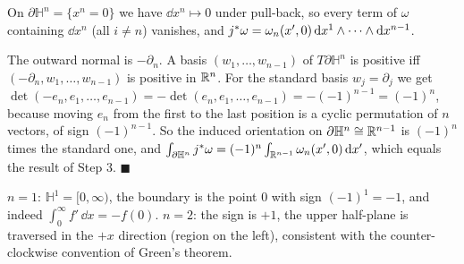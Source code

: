  On $\partial\mathbb H^n=\{x^n=0\}$ we have $\dd x^n\mapsto0$ under pull-back, so every term of $\omega$ containing $\dd x^n$ (all $i\neq n$) vanishes, and $j{}^{*}\omega=\omega_n(x',0)\,\mathrm{d} x^1\wedge\cdots\wedge\mathrm{d} x^{n-1}$.

 The outward normal is $-\partial_n$. A basis $(w_1,\dots,w_{n-1})$ of $T\partial\mathbb H^n$ is positive iff $(-\partial_n,w_1,\dots,w_{n-1})$ is positive in $\mathbb{R}^n$. For the standard basis $w_j=\partial_j$ we get
$\det(-e_n,e_1,\dots,e_{n-1})=-\det(e_n,e_1,\dots,e_{n-1})=-(-1)^{n-1}=(-1)^n$, because moving $e_n$ from the first to the last position is a cyclic permutation of $n$ vectors, of sign $(-1)^{n-1}$. So the induced orientation on $\partial\mathbb H^n\cong\mathbb{R}^{n-1}$ is $(-1)^n$ times the standard one, and $\int_{\partial\mathbb H^n}j{}^{*}\omega=(-1)^n\int_{\mathbb{R}^{n-1}}\omega_n(x',0)\,\mathrm{d} x'$, which equals the result of Step 3. \hfill$\blacksquare$

\begin{specialcase}[sanity checks of the sign: $n=1$ and $n=2$]
$n=1$: $\mathbb H^1=[0,\infty)$, the boundary is the point $0$ with sign $(-1)^1=-1$, and indeed $\int_0^\infty f'\,\dd x=-f(0)$.
$n=2$: the sign is $+1$, the upper half-plane is traversed in the $+x$ direction (region on the left), consistent with the counter-clockwise convention of Green's theorem.
\end{specialcase}


